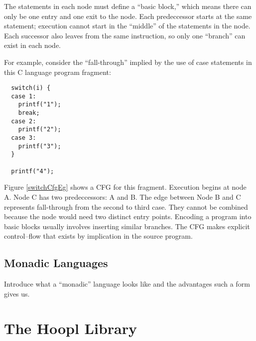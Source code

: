 \documentclass[11pt]{article}
\begin{document}
The statements in each node must define a ``basic block,'' which means
there can only be one entry and one exit to the node. Each 
predeccessor starts at the same statement; execution cannot start in
the ``middle'' of the statements in the node. Each successor also
leaves from the same instruction, so only one ``branch'' can exist in
each node.

For example, consider the ``fall-through'' implied by the use of case
statements in this C language program fragment:

\begin{verbatim}
  switch(i) {
  case 1:
    printf("1");
    break;
  case 2:
    printf("2");
  case 3:
    printf("3");
  }

  printf("4");
\end{verbatim}

Figure \ref{switchCfgEg} shows a CFG for this fragment. Execution
begins at node A. Node C has two predeccessors: A and B. The edge
between Node B and C represents fall-through from the second to third
case. They cannot be combined because the node would need two distinct
entry points. Encoding a program into basic blocks usually involves
inserting similar branches. The CFG makes explicit control--flow that
exists by implication in the source program.

\begin{comment}
\begin{verbatim}
   A
  switch   ----<-
  | |  |  |      |
  | |  |  v C    ^
  | |   ->case 3 |
  | |     |      |
  | |      ->----_-- 
  | | B          |  |
  |  ->case 2 ->-   v
  |                 |
  |   D       ----<-
   ->case 1  |
     |       v
     v       |
   --------<-      
  |  E
   ->printf("3")
\end{verbatim}
\end{comment}




\subsection{Monadic Languages}

Introduce what a ``monadic'' language looks like and the advantages such a form
gives us.

\section{The Hoopl Library}
\end{document}
